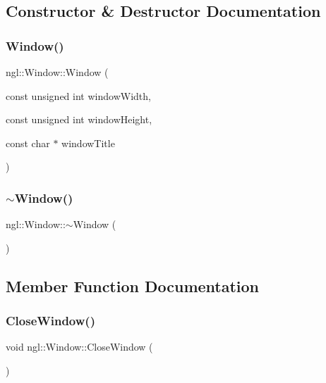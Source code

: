 \subsection{Constructor \& Destructor Documentation}
\mbox{\label{classngl_1_1_window_ab16003928f7ee5751be23bd3ae14667d}} 
\subsubsection{\texorpdfstring{Window()}{Window()}}
{\footnotesize\ttfamily ngl\+::\+Window\+::\+Window (\begin{DoxyParamCaption}\item[{const unsigned int}]{window\+Width,  }\item[{const unsigned int}]{window\+Height,  }\item[{const char $\ast$}]{window\+Title }\end{DoxyParamCaption})\hspace{0.3cm}{\ttfamily [explicit]}}

\mbox{\label{classngl_1_1_window_a4cc0bbb6a8683eb7feadabba9f5aab8f}} 
\subsubsection{\texorpdfstring{$\sim$\+Window()}{~Window()}}
{\footnotesize\ttfamily ngl\+::\+Window\+::$\sim$\+Window (\begin{DoxyParamCaption}{ }\end{DoxyParamCaption})\hspace{0.3cm}{\ttfamily [virtual]}}



\subsection{Member Function Documentation}
\mbox{\label{classngl_1_1_window_a1b278686756a2ef16d2100edc2022470}} 
\subsubsection{\texorpdfstring{Close\+Window()}{CloseWindow()}}
{\footnotesize\ttfamily void ngl\+::\+Window\+::\+Close\+Window (\begin{DoxyParamCaption}{ }\end{DoxyParamCaption})}

